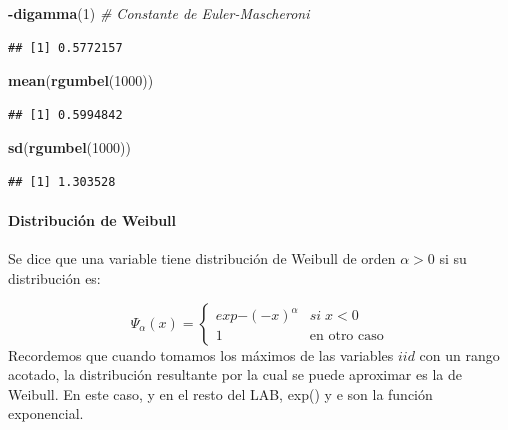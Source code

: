 \documentclass[
  12pt]{article}
\newenvironment{Shaded}{\begin{snugshade}}{\end{snugshade}}
\newcommand{\CommentTok}[1]{\textcolor[rgb]{0.56,0.35,0.01}{\textit{#1}}}
\newcommand{\DecValTok}[1]{\textcolor[rgb]{0.00,0.00,0.81}{#1}}
\newcommand{\FunctionTok}[1]{\textcolor[rgb]{0.13,0.29,0.53}{\textbf{#1}}}
\newcommand{\NormalTok}[1]{#1}
\newcommand{\SpecialCharTok}[1]{\textcolor[rgb]{0.81,0.36,0.00}{\textbf{#1}}}
\begin{document}
\begin{Shaded}
\begin{Highlighting}[]
\SpecialCharTok{{-}}\FunctionTok{digamma}\NormalTok{(}\DecValTok{1}\NormalTok{) }\CommentTok{\# Constante de Euler{-}Mascheroni}
\end{Highlighting}
\end{Shaded}

\begin{verbatim}
## [1] 0.5772157
\end{verbatim}

\begin{Shaded}
\begin{Highlighting}[]
\FunctionTok{mean}\NormalTok{(}\FunctionTok{rgumbel}\NormalTok{(}\DecValTok{1000}\NormalTok{))}
\end{Highlighting}
\end{Shaded}

\begin{verbatim}
## [1] 0.5994842
\end{verbatim}

\begin{Shaded}
\begin{Highlighting}[]
\FunctionTok{sd}\NormalTok{(}\FunctionTok{rgumbel}\NormalTok{(}\DecValTok{1000}\NormalTok{))}
\end{Highlighting}
\end{Shaded}

\begin{verbatim}
## [1] 1.303528
\end{verbatim}

\hypertarget{distribuciuxf3n-de-weibull}{%
\paragraph{Distribución de Weibull}\label{distribuciuxf3n-de-weibull}}

Se dice que una variable tiene distribución de Weibull de orden
\(\alpha>0\) si su distribución es:

\[\Psi_{\alpha}(x)=\begin{cases}
exp{-(-x)^{\alpha}} & si\;x<0\\
1 & \text{en otro caso}
\end{cases}\] Recordemos que cuando tomamos los máximos de las variables
\(iid\) con un rango acotado, la distribución resultante por la cual se
puede aproximar es la de Weibull. En este caso, y en el resto del LAB,
exp() y e son la función exponencial.
\end{document}
